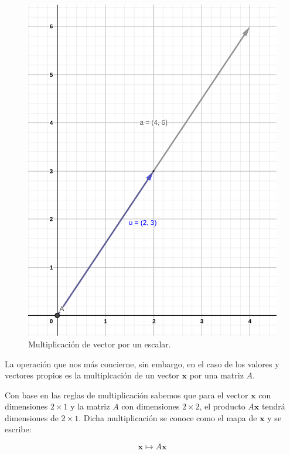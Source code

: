 \documentclass[
]{book}
\begin{document}
\begin{figure}

{\centering \includegraphics{Unidad-II/Mult-vector} 

}

\caption{Multiplicación de vector por un escalar.}\label{fig:vector-escalar}
\end{figure}

La operación que nos más concierne, sin embargo, en el caso de los valores y vectores propios es la multiplcación de un vector \(\mathbf{x}\) por una matriz \(A\).

Con base en las reglas de multiplicación sabemos que para el vector \(\mathbf{x}\) con dimensiones \(2 \times 1\) y la matriz \(A\) con dimensiones \(2 \times 2\), el producto \(A \mathbf{x}\) tendrá dimensiones de \(2 \times 1\). Dicha multiplicación se conoce como el mapa de \(\mathbf{x}\) y se escribe:

\begin{equation}
\mathbf{x} \mapsto A\mathbf{x} \label{eq:mapa}
\end{equation}
\end{document}
